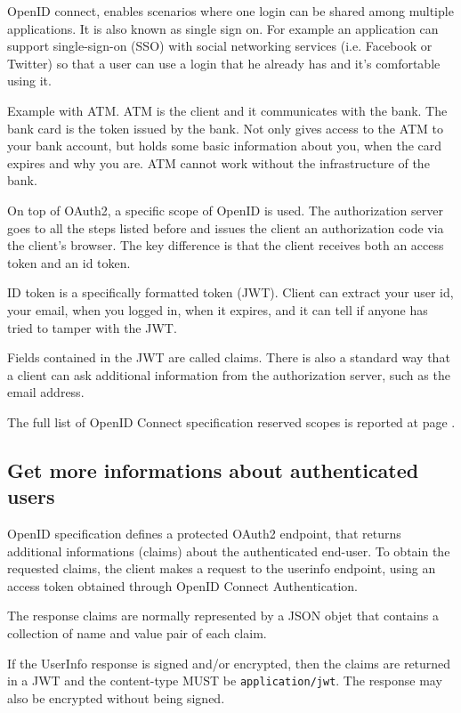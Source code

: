 OpenID connect, enables scenarios where one login can be shared among multiple
applications. It is also known as single sign on.
For example an application can support single-sign-on (SSO) with social networking services (i.e.
Facebook or Twitter) so that a user can use a login that he already has and it's
comfortable using it.

Example with ATM. ATM is the client and it communicates with the bank. The bank
card is the token issued by the bank. Not only gives access to the ATM to your
bank account, but holds some basic information about you, when the card expires
and why you are.
ATM cannot work without the infrastructure of the bank.

On top of OAuth2, a specific scope of OpenID is used. The authorization server
goes to all the steps listed before and issues the client an authorization code
via the client's browser.
The key difference is that the client receives both an access token and an id
token.

ID token is a specifically formatted token (JWT). Client can extract your user
id, your email, when you logged in, when it expires, and it can tell if anyone
has tried to tamper with the JWT.

Fields contained in the JWT are called claims.
There is also a standard way that a client can ask additional information from the
authorization server, such as the email address.

The full list of OpenID Connect specification reserved scopes is reported at
page \pageref{openid}.

\subsection{Get more informations about authenticated users}
OpenID specification defines a protected OAuth2 endpoint, that returns
additional informations (claims) about the authenticated end-user.
To obtain the requested claims, the client makes a request to the userinfo
endpoint, using an access token obtained through OpenID Connect
Authentication.

The response claims are normally represented by a JSON objet that contains a
collection of name and value pair of each claim.

If the UserInfo response is signed and/or encrypted, then the claims are
returned in a JWT and the content-type MUST be \texttt{application/jwt}.
The response may also be encrypted without being signed.


